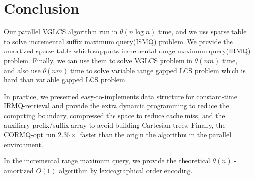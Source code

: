 \section{Conclusion}
\label{sec:Conclusion}

Our parallel VGLCS algorithm run in $\theta(n \log n)$ time, and we
use sparse table to solve incremental suffix maximum query(ISMQ)
problem.  We provide the amortized sparse table which supports
incremental range maximum query(IRMQ) problem.  Finally, we can use
them to solve VGLCS problem in $\theta(nm)$ time, and also use
$\theta(nm)$ time to solve variable range gapped LCS problem which is
hard than variable gapped LCS problem.

In practice, we presented easy-to-implements data structure for
constant-time IRMQ-retrieval and provide the extra dynamic programming to
reduce the computing boundary, compressed the space to reduce cache
miss, and the auxiliary prefix/suffix array to avoid building
Cartesian trees. Finally, the CORMQ-opt run $2.35 \times$ faster than
the origin the algorithm in the parallel environment.

In the incremental range maximum query, we provide the theoretical
$\theta(n)$ - amortized $O(1)$ algorithm by lexicographical order
encoding.

\iffalse
我們修改 VGLCS 的序列算法，將其平行化於 $\theta(n \log n)$ 時間內，
並以稀疏表實作 ISMQ 問題。提出的稀疏表能解決比 VGLCS 更困難的 Variable Range Gapped LCS，
致使 VIGLCS 可在時間複雜度 $\theta(nm)$ 被解決。

在實務上，我們提供以動態規劃減少計算量，以及使用空間壓縮降低快取未中的策略，
最終平行 RMQ 獲取 $2.35 \times$ 倍的加速；在增長區間最大值詢問 (IRMQ) 問題中，
以字典順序的編碼策略，提出理論 $\theta(n)$ -- amortized $\theta(1)$  的算法。
\fi